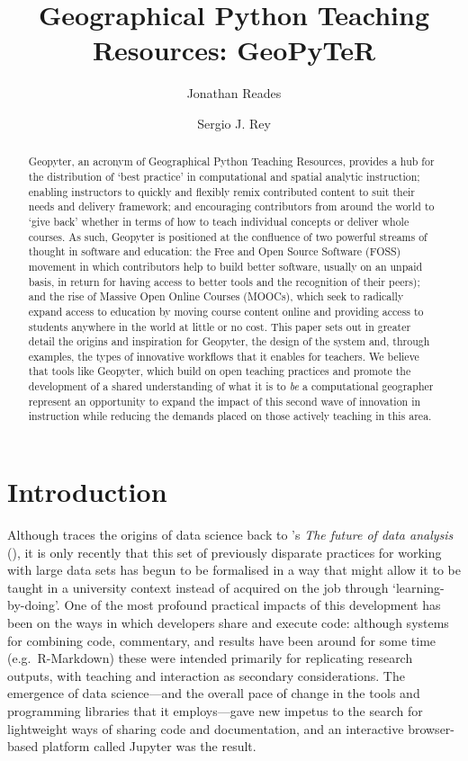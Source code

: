 \documentclass[letter, 11pt,titlepage]{article}
\title{Geographical Python Teaching Resources: GeoPyTeR}
\author{Jonathan Reades \and Sergio J. Rey}
\newcommand{\eg}{e.g.~\/}
\begin{document}
\maketitle

\begin{abstract}
Geopyter, an acronym of Geographical Python Teaching Resources, provides
a hub for the distribution of `best practice' in computational and
spatial analytic instruction; enabling instructors to quickly and
flexibly remix contributed content to suit their needs and delivery
framework; and encouraging contributors from around the world to `give
back' whether in terms of how to teach individual concepts or deliver
whole courses. As such, Geopyter is positioned at the confluence of two
powerful streams of thought in software and education: the Free and Open
Source Software (FOSS) movement in which contributors help to build
better software, usually on an unpaid basis, in return for having access
to better tools and the recognition of their peers); and the rise of
Massive Open Online Courses (MOOCs), which seek to radically expand
access to education by moving course content online and providing access
to students anywhere in the world at little or no cost. This paper sets
out in greater detail the origins and inspiration for Geopyter, the
design of the system and, through examples, the types of innovative
workflows that it enables for teachers. We believe that tools like
Geopyter, which build on open teaching practices and promote the
development of a shared understanding of what it is to \emph{be} a
computational geographer represent an opportunity to expand the impact
of this second wave of innovation in instruction while reducing the
demands placed on those actively teaching in this area.
\end{abstract}


\section{Introduction}\label{introduction}

Although \citet{Donoho2017} traces the origins of data science back to
\citeauthor{Tukey1962}'s \emph{The future of data analysis}
(\citeyear{Tukey1962}), it is only recently that this set of previously disparate practices for working with large data sets has begun to be formalised in a way that might allow it to be taught in a university context instead of acquired on the job through `learning-by-doing'. One of the most profound practical impacts of this development has been on the ways in which developers share and execute code: although systems for combining code, commentary, and results have been around for some time (\eg R-Markdown) these were intended primarily for replicating research outputs, with teaching and interaction as secondary considerations. The emergence of data science---and the overall pace of change in the tools and programming libraries that it employs---gave new impetus to the search for lightweight ways of sharing code and documentation, and an interactive browser-based platform called Jupyter \citep{kluyver16} was the result.
\end{document}
